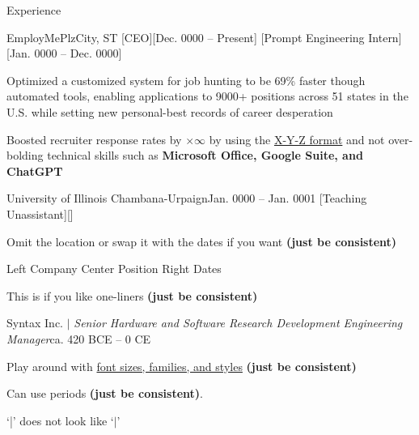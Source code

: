 \documentclass[9pt]{extarticle} %
\begin{document}
\begin{sectionList}{Experience}
    \item \lr
    {EmployMePlz}{City, ST}
    [CEO][Dec. 0000 -- Present]
    [Prompt Engineering Intern][Jan. 0000 -- Dec. 0000]
    \begin{bullets}
        \item Optimized a customized system for job hunting to be 69\% faster though automated tools, enabling applications to 9000+ positions across 51 states in the U.S. while setting new personal-best records of career desperation
        \item Boosted recruiter response rates by $\times \infty$ by using the \href{https://www.inc.com/bill-murphy-jr/google-recruiters-say-these-5-resume-tips-including-x-y-z-formula-will-improve-your-odds-of-getting-hired-at-google.html}{X-Y-Z format} and not over-bolding technical skills such as \textbf{Microsoft Office, Google Suite, and ChatGPT}
    \end{bullets}

    \item \lr
    {University of Illinois Chambana-Urpaign}{Jan. 0000 -- Jan. 0001}
    [Teaching Unassistant][]
    \begin{bullets}
        \item Omit the location or swap it with the dates if you want \textbf{(just be consistent)}
    \end{bullets}

    \item \lcr
    {Left Company}
    {Center Position}
    {Right Dates}
    \begin{bullets}
        \item This is if you like one-liners \textbf{(just be consistent)}
    \end{bullets}

    \item \lr
    {Syntax Inc. $|$ \textnormal{\textit{Senior Hardware and Software Research Development Engineering Manager}}}{ca. 420 BCE -- 0 CE}
    \begin{bullets}
        \item Play around with \href{https://www.overleaf.com/learn/latex/Font_sizes%2C_families%2C_and_styles}{font sizes, families, and styles} \textbf{(just be consistent)}
        \item Can use periods \textbf{(just be consistent)}.
        \item `|' does not look like `$\vert$'
    \end{bullets}
\end{sectionList}
\end{document}
